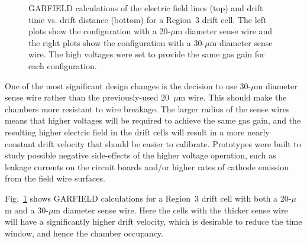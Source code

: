 \begin{figure}[htbp]
\vspace{10.0cm}
\caption{\small{GARFIELD calculations of the electric field lines (top)
and drift time vs. drift distance (bottom) for a Region~3 drift cell.  The 
left plots show the configuration with a 20-$\mu$m diameter sense wire and 
the right plots show the configuration with a 30-$\mu$m diameter sense wire.
The high voltages were set to provide the same gas gain for each
configuration.}}
\label{garfield}
\end{figure}

One of the most significant design changes is the decision 
to use 30-$\mu$m diameter sense wire rather than the previously-used 
20~$\mu$m wire. 
This should make the chambers more resistant to wire 
breakage.  The larger radius of the sense wires means that higher 
voltages will be required to achieve the same gas gain, 
and the resulting higher electric field in the drift cells will result in 
a more nearly constant drift velocity that should be easier to calibrate.
Prototypes were built to study possible negative side-effects of the 
higher voltage operation, such as leakage currents on the circuit boards 
and/or higher rates of cathode emission from the field wire surfaces.

Fig.~\ref{garfield} shows GARFIELD calculations for a Region~3 drift cell
with both a 20-$\mu$m and a 30-$\mu$m diameter sense wire.  Here the
cells with the thicker sense wire will have a significantly higher drift 
velocity, which is desirable to reduce the time window, and hence the 
chamber occupancy.



 
